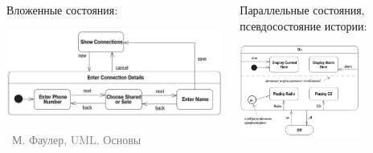 \documentclass[xetex,mathserif,serif]{beamer}
\newcommand{\attribution}[1] {
    \vspace{-5mm}\begin{flushright}\begin{scriptsize}\textcolor{gray}{\textcopyright\, #1}\end{scriptsize}\end{flushright}
}
\begin{document}
\begin{frame}
        \begin{columns}
            \begin{column}{0.5\textwidth}
                Вложенные состояния:
                \begin{center}
                    \includegraphics[width=\textwidth]{stateTransitionNestedStates.png}
                    \attribution{М. Фаулер, UML. Основы}
                \end{center}
            \end{column}
            \begin{column}{0.5\textwidth}
                Параллельные состояния, псевдосостояние истории:
                \begin{center}
                    \includegraphics[width=0.7\textwidth]{stateTransitionParallelStates.png}
                \end{center}
            \end{column}
        \end{columns}
    \end{frame}
\end{document}
